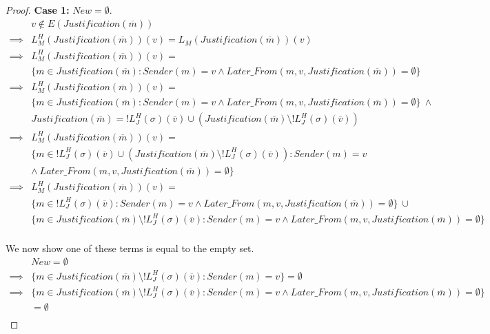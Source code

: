 \begin{proof}
\textbf{Case 1:} $New = \emptyset$.
\begin{align}
          &v \notin E(Justification(\overline{m})) \\
  \implies&L^H_M(Justification(\overline{m}))(v) = L_M(Justification(\overline{m}))(v) \\
  \implies&L^H_M(Justification(\overline{m}))(v) = \\
          &\{m \in Justification(\overline{m}) : Sender(m) = v \land Later\_From(m,v,Justification(\overline{m})) = \emptyset\} \\
  \implies&L^H_M(Justification(\overline{m}))(v) = \\
          &\{m \in Justification(\overline{m}) : Sender(m) = v \land Later\_From(m,v,Justification(\overline{m})) = \emptyset\} ~\land \\
          &Justification(\overline{m}) = !L^H_J(\sigma)(\overline{v}) \cup (Justification(\overline{m}) \setminus !L^H_J(\sigma)(\overline{v})) \\
  \implies&L^H_M(Justification(\overline{m}))(v) = \\
          &\{m \in !L^H_J(\sigma)(\overline{v}) \cup (Justification(\overline{m}) \setminus !L^H_J(\sigma)(\overline{v})) : Sender(m) = v \\
          &\land~ Later\_From(m,v,Justification(\overline{m})) = \emptyset\} \\
  \implies&L^H_M(Justification(\overline{m}))(v) = \\
          &\{m \in !L^H_J(\sigma)(\overline{v}) : Sender(m) = v \land Later\_From(m,v,Justification(\overline{m})) = \emptyset\} ~\cup \\
          &\{m \in Justification(\overline{m}) \setminus !L^H_J(\sigma)(\overline{v}) : Sender(m) = v \land Later\_From(m,v,Justification(\overline{m})) = \emptyset\}\\
\end{align}

We now show one of these terms is equal to the empty set.
\begin{align}
          &New = \emptyset \\
  \implies&\{m \in Justification(\overline{m}) \setminus !L^H_J(\sigma)(\overline{v}) : Sender(m) = v \} = \emptyset \\
  \implies&\{m \in Justification(\overline{m}) \setminus !L^H_J(\sigma)(\overline{v}) : Sender(m) = v \land Later\_From(m,v,Justification(\overline{m})) = \emptyset\} \\
          &= \emptyset \\
\end{align}


\end{proof}
